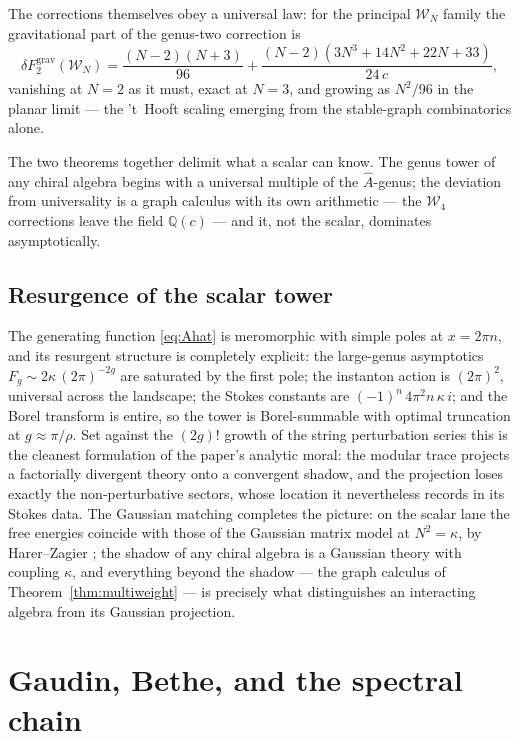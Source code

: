 \documentclass[11pt]{amsart}
\numberwithin{equation}{section}
\theoremstyle{plain}
\theoremstyle{definition}
\theoremstyle{remark}
\newcommand{\cW}{\mathcal{W}}
\newcommand{\bQ}{\mathbb{Q}}
\begin{document}
The corrections themselves obey a universal law: for the principal
$\cW_N$ family the gravitational part of the genus-two correction is
\begin{equation}
\delta F_2^{\mathrm{grav}}(\cW_N)
=\frac{(N-2)(N+3)}{96}
+\frac{(N-2)(3N^{3}+14N^{2}+22N+33)}{24\,c},
\end{equation}
vanishing at $N=2$ as it must, exact at $N=3$, and growing as
$N^{2}/96$ in the planar limit --- the 't~Hooft scaling emerging from
the stable-graph combinatorics alone.

The two theorems together delimit what a scalar can know. The genus
tower of any chiral algebra begins with a universal multiple of the
$\widehat{A}$-genus; the deviation from universality is a graph
calculus with its own arithmetic --- the $\cW_4$ corrections leave the
field $\bQ(c)$ --- and it, not the scalar, dominates asymptotically.

\subsection{Resurgence of the scalar tower}

The generating function \eqref{eq:Ahat} is meromorphic with simple
poles at $x=2\pi n$, and its resurgent structure is completely
explicit: the large-genus asymptotics
$F_g\sim2\kappa\,(2\pi)^{-2g}$ are saturated by the first pole; the
instanton action is $(2\pi)^{2}$, universal across the landscape; the
Stokes constants are $(-1)^{n}\,4\pi^{2}n\,\kappa\,i$; and the Borel
transform is entire, so the tower is Borel-summable with optimal
truncation at $g\approx\pi/\rho$. Set against the $(2g)!$ growth of
the string perturbation series this is the cleanest formulation of
the paper's analytic moral: the modular trace projects a factorially
divergent theory onto a convergent shadow, and the projection loses
exactly the non-perturbative sectors, whose location it nevertheless
records in its Stokes data. The Gaussian matching completes the
picture: on the scalar lane the free energies coincide with those of
the Gaussian matrix model at $N^{2}=\kappa$, by Harer--Zagier \cite{HZ}; the
shadow of any chiral algebra is a Gaussian theory with coupling
$\kappa$, and everything beyond the shadow --- the graph calculus
of Theorem~\ref{thm:multiweight} --- is precisely what distinguishes
an interacting algebra from its Gaussian projection.

\section{Gaudin, Bethe, and the spectral chain}\label{sec:gaudin}
\end{document}
